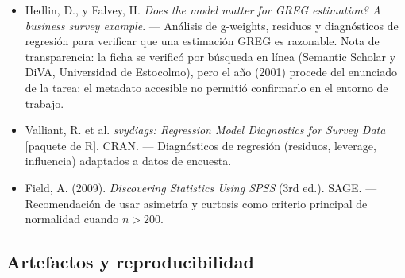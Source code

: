 {\begin{itemize}
        de Cochran (1977, pp.~132--134) sobre el número de estratos y el tamaño
        mínimo por estrato.
  \item Hedlin, D., y Falvey, H. \emph{Does the model matter for GREG estimation?
        A business survey example}. --- Análisis de g-weights, residuos y
        diagnósticos de regresión para verificar que una estimación GREG es
        razonable. Nota de transparencia: la ficha se verificó por búsqueda en
        línea (Semantic Scholar y DiVA, Universidad de Estocolmo), pero el año
        (2001) procede del enunciado de la tarea: el metadato accesible no
        permitió confirmarlo en el entorno de trabajo.
  \item Valliant, R. et al. \emph{svydiags: Regression Model Diagnostics for
        Survey Data} [paquete de R]. CRAN. --- Diagnósticos de regresión
        (residuos, leverage, influencia) adaptados a datos de encuesta.
  \item Field, A. (2009). \emph{Discovering Statistics Using SPSS} (3rd ed.).
        SAGE. --- Recomendación de usar asimetría y curtosis como criterio
        principal de normalidad cuando $n > 200$.
\end{itemize}
}

\subsection*{Artefactos y reproducibilidad}

